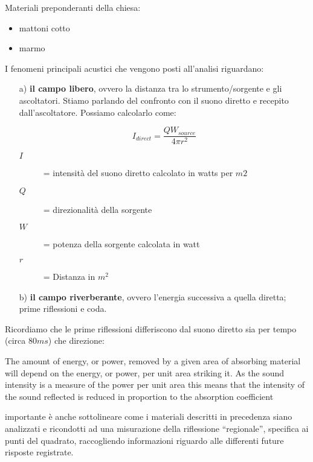 Materiali preponderanti della chiesa:

\begin{itemize}
	\item mattoni cotto
	\item marmo
\end{itemize}

I fenomeni principali acustici che vengono posti all'analisi riguardano:

\begin{enumerate}
	\item[a)] \textbf{il campo libero}, ovvero la distanza tra lo strumento/sorgente e gli ascoltatori. 
Stiamo parlando del confronto con il suono diretto e recepito dall'ascoltatore. Possiamo calcolarlo come:

\begin{equation}
I_{direct} = \frac{QW_{source}}{4\pi r^2}
\end{equation}

	\begin{description}
		\item[$I$] = intensità del suono diretto calcolato in watts per $m2$
		\item[$Q$] = direzionalità della sorgente 
		\item[$W$] = potenza della sorgente calcolata in watt 
		\item[$r$] = Distanza in $m^2$
	\end{description}
		
	\item[b)] \textbf{il campo riverberante}, ovvero l'energia successiva a quella diretta; prime riflessioni e coda.

\end{enumerate}

Ricordiamo che le prime riflessioni differiscono dal suono diretto sia per tempo (circa $80ms$) che direzione:


\begin{quoting}
The amount of energy, or power, removed by a given area of absorbing material will depend on the energy,
or power, per unit area striking it. As the sound intensity is a measure of the power per unit area this
means that the intensity of the sound reflected is reduced in proportion to the absorption
coefficient%
\end{quoting}

importante è anche sottolineare come i materiali descritti in precedenza siano analizzati e ricondotti ad
una misurazione della riflessione “regionale”, specifica ai punti del quadrato, raccogliendo informazioni
riguardo alle differenti future risposte registrate.

